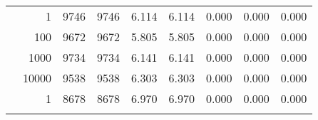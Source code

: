 \begin{table}
\begin{tabular}{rrrrrrrrr}
	            
	        
				\noalign{\smallskip}\hline
				\multirow{ 4 }{*}{ 80000 } &
				
					
					 
					\multirow{ 1 }{*}{ 1 } &
					
						
							    
							     9746  & 9746  
	                           & 6.114 & 6.114 & 0.000
	                           & 0.000 & 0.000  \\
	                
	            
					 &  
					 
					\multirow{ 1 }{*}{ 100 } &
					
						
							    
							     9672  & 9672  
	                           & 5.805 & 5.805 & 0.000
	                           & 0.000 & 0.000  \\
	                
	            
					 &  
					 
					\multirow{ 1 }{*}{ 1000 } &
					
						
							    
							     9734  & 9734  
	                           & 6.141 & 6.141 & 0.000
	                           & 0.000 & 0.000  \\
	                
	            
					 &  
					 
					\multirow{ 1 }{*}{ 10000 } &
					
						
							    
							     9538  & 9538  
	                           & 6.303 & 6.303 & 0.000
	                           & 0.000 & 0.000  \\
	                
	            
	        
				\noalign{\smallskip}\hline
				\multirow{ 4 }{*}{ 160000 } &
				
					
					 
					\multirow{ 1 }{*}{ 1 } &
					
						
							    
							     8678  & 8678  
	                           & 6.970 & 6.970 & 0.000
	                           & 0.000 & 0.000  \\
	                
	            
					 &  
					 

\end{tabular}
\end{table}
